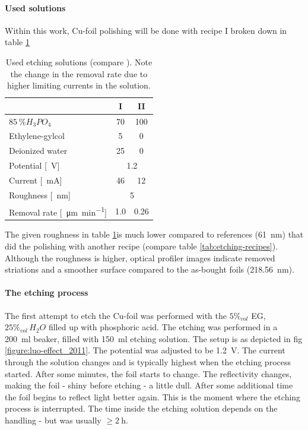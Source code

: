 \paragraph{Used solutions}
Within this work, Cu-foil polishing will be done with recipe I broken down in table \ref{table:used-etching-solutions}
\begin{table}\centering
\caption{Used etching solutions (compare \cite[130]{jinshan_electrochemical_2004}). Note the change in the removal rate due to higher limiting currents in the solution.}
 \begin{tabular}{lcc}
  & I & II \\ \hline \hline
  $\SI{85}{\percent} H_3PO_4$ & 70 & 100 \\
  Ethylene-gylcol & 5 & 0 \\
  Deionized water & 25 & 0 \\ \hline
  Potential [\SI{}{\V}] & \multicolumn{2}{c}{\SI{1.2}{}} \\
  Current [\SI{}{\mA}] & 46 & 12\\
  Roughness [\SI{}{\nm}] & \multicolumn{2}{c}{\SI{5}{}} \\
  Removal rate [\SI{}{\micro\meter\per\minute}] & \SI{1,0}{} & \SI{0,26}{}\\
 \end{tabular}
\label{table:used-etching-solutions}
\end{table}
The given roughness in table \ref{table:used-etching-solutions}is much lower compared to references (\SI{61}{\nm})\cite[2]{bin_zhang_low-temperature_2012} that did the polishing with another recipe (compare table \ref{tab:etching-recipes}). Although the roughness is higher, optical profiler images indicate removed striations and a smoother surface compared to the as-bought foils (\SI{218,56}{\nm})\cite[2]{bin_zhang_low-temperature_2012}.

\paragraph{The etching process}
The first attempt to etch the Cu-foil was performed with the $5\%_{vol}$ EG, $25\%_{vol}\,H_2O$ filled up with phosphoric acid. The etching was performed in a \SI{200}{\ml} beaker, filled with \SI{150}{\ml} etching solution. The setup is as depicted in fig \ref{figure:luo-effect_2011}. The potential was adjusted to be \SI{1.2}{\V}. The current through the solution changes and is typically highest when the etching process started. After some minutes, the foil starts to change. The reflectivity changes, making the foil - shiny before etching - a little dull. After some additional time the foil begins to reflect light better again. This is the moment where the etching process is interrupted. The time inside the etching solution depends on the handling - but was usually $\geq \SI{2}{\hour}$. 

